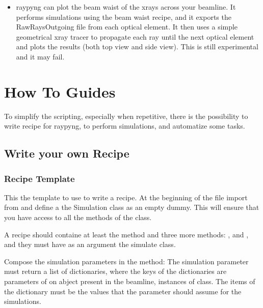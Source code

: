 \documentclass[letterpaper,10pt,english]{sphinxmanual}
\begin{document}
\begin{itemize}
\item {} 
\sphinxAtStartPar
{}
raypyng can plot the beam waist of
the x\sphinxhyphen{}rays across your beamline. It performs simulations using the beam waist recipe,
and it exports the RawRaysOutgoing file from each optical element. It then uses a
simple geometrical x\sphinxhyphen{}ray tracer to propagate each ray until the next optical
element and plots the results (both top view and side view). This is still
experimental and it may fail.

\end{itemize}

\sphinxstepscope


\chapter{How To Guides}
\label{\detokenize{how_to:how-to-guides}}\label{\detokenize{how_to::doc}}
\sphinxAtStartPar
To simplify the scripting, especially when repetitive,
there is the possibility to write recipe for raypyng, to
perform simulations, and automatize some tasks.


\section{Write your own Recipe}
\label{\detokenize{how_to:write-your-own-recipe}}

\subsection{Recipe Template}
\label{\detokenize{how_to:recipe-template}}
\sphinxAtStartPar
This the template to use to write a recipe.
At the beginning of the file import
 from 
and define a the Simulation class as an empty dummy.
This will ensure that you have access to all the methods of the
 class.

\sphinxAtStartPar
A recipe should containe at least the 
method and three more methods: ,
and ,
and they must have as an argument the simulate class.

\sphinxAtStartPar
Compose the simulation parameters in the  method:
The simulation parameter must return a list of dictionaries,
where the keys of the dictionaries are parameters of on abject
present in the beamline, instances of  class.
The items of the dictionary must be the values that the parameter should
assume for the simulations.
\end{document}
